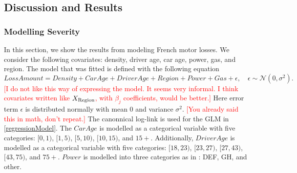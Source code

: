 \documentclass[11pt,letterpaper]{article}
\numberwithin{equation}{section}
\numberwithin{equation}{section}
\numberwithin{equation}{section}
\begin{document}
\subsection{Discussion and Results}
\subsubsection{Modelling Severity}
In this section, we show the results from modeling French motor losses. We consider the following covariates: density, driver age, car age, power, gas,  and region. %
The model that was fitted is defined with the following equation
\begin{equation}
Loss Amount =  Density + Car Age + Driver Age + Region + Power + Gas + \epsilon, \quad \epsilon \sim \mathcal{N}(0,\sigma^2). \label{regressionModel}
\end{equation}
\textcolor{red}{[I do not like this way of expressing the model. It seems very informal. I think covariates written like $X_{\tiny \text{Region}}$, with $\beta_j$ coefficients, would be better.]}
Here error term $\epsilon$ is distributed normally with mean $0$ and variance $\sigma^2$. \textcolor{red}{[You already said this in math, don't repeat.]} 
The canonnical log-link is used for the GLM in \eqref{regressionModel}. The
$CarAge$ is modelled as a categorical variable with five categories: $[0,1)$, $[1,5)$, $[5,10)$, $[10,15)$, and $15+$. Additionally, $DriverAge$ is modelled as a categorical variable with five categories: $[18,23)$, $[23,27)$, $[27,43)$, $[43,75)$, and $75+$. $Power$ is modelled into three categories as in \cite{Charpentier:2014}:
DEF, GH, and other.
\end{document}
